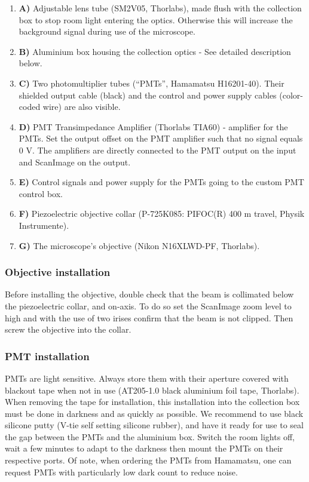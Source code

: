 \documentclass[10pt,letterpaper]{article}
\begin{document}
\begin{enumerate}[]
    \item \textbf{A)} Adjustable lens tube (SM2V05, Thorlabs), made flush with the collection box to stop room light entering the optics. Otherwise this will increase the background signal during use of the microscope. 
    \item \textbf{B)} Aluminium box housing the collection optics - See detailed description below.
    \item \textbf{C)} Two photomultiplier tubes (``PMTs'', Hamamatsu H16201-40). Their shielded output cable (black) and the control and power supply cables (color-coded wire) are also visible.
    \item \textbf{D)} PMT Transimpedance Amplifier (Thorlabs TIA60) - amplifier for the PMTs. Set the output offset on the PMT amplifier such that no signal equals 0 V. The amplifiers are directly connected to the PMT output on the input and ScanImage on the output.
    \item \textbf{E)} Control signals and power supply for the PMTs going to the custom PMT control box.
    \item \textbf{F)} Piezoelectric objective collar (P-725K085: PIFOC(R) 400 \textmu m travel, Physik Instrumente).
    \item \textbf{G)} The microscope's objective (Nikon N16XLWD-PF, Thorlabs).
\end{enumerate}
%
\subsubsection{Objective installation}
Before installing the objective, double check that the beam is collimated below the piezoelectric collar, and on-axis. To do so set the ScanImage zoom level to high and with the use of two irises confirm that the beam is not clipped. Then screw the objective into the collar.
 
\subsubsection{PMT installation}
PMTs are light sensitive. Always store them with their aperture covered with blackout tape when not in use (AT205-1.0 black aluminium foil tape, Thorlabs). When removing the tape for installation, this installation into the collection box must be done in darkness and as quickly as possible. We recommend to use black silicone putty (V-tie self setting silicone rubber), and have it ready for use to seal the gap between the PMTs and the aluminium box. Switch the room lights off, wait a few minutes to adapt to the darkness then mount the PMTs on their respective ports. Of note, when ordering the PMTs from Hamamatsu, one can request PMTs with particularly low dark count to reduce noise.
\end{document}
